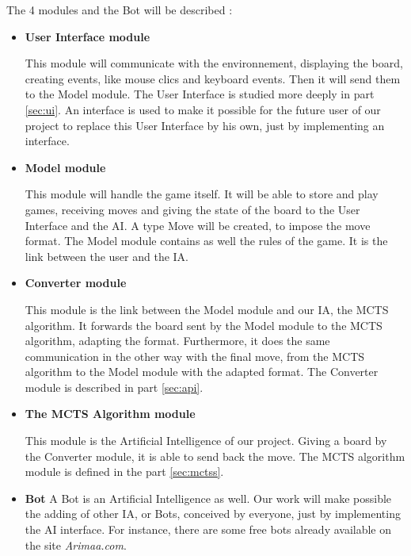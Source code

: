 The 4 modules and the Bot will be described :

\begin{itemize}
\item \textbf{User Interface module}

This module will communicate with the environnement, displaying the board, creating events, like mouse clics and keyboard events. Then it will send them to the Model module. The User Interface is studied more deeply in part \ref{sec:ui}. An interface is used to make it possible for the future user of our project to replace this User Interface by his own, just by implementing an interface.

\item \textbf{Model module}

This module will handle the game itself. It will be able to store and play games, receiving moves and giving the state of the board to the User Interface and the AI. A type Move will be created, to impose the move format. The Model module contains as well the rules of the game. It is the link between the user and the IA.

\item \textbf{Converter module}

This module is the link between the Model module and our IA, the MCTS algorithm. It forwards the board sent by the Model module to the MCTS algorithm, adapting the format. Furthermore, it does the same communication in the other way with the final move, from the MCTS algorithm to the Model module with the adapted format. The Converter module is described in part \ref{sec:api}.

\item \textbf{The MCTS Algorithm module}

This module is the Artificial Intelligence of our project. Giving a board by the Converter module, it is able to send back the move. The MCTS algorithm module is defined in the part \ref{sec:mctss}.

\item \textbf{Bot}
A Bot is an Artificial Intelligence as well. Our work will make possible the adding of other IA, or Bots, conceived by everyone, just by implementing the AI interface. For instance, there are some free bots already available on the site \textit{Arimaa.com}.
\end{itemize}